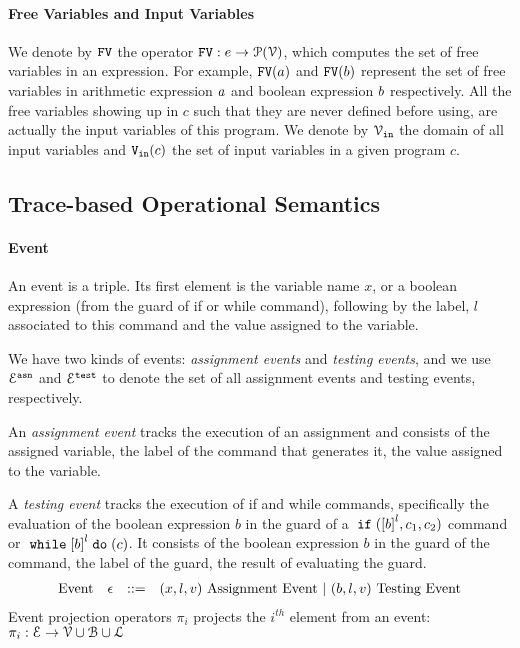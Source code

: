 \paragraph{Free Variables and Input Variables}
  We denote by $\mathtt{FV}$ the operator $\mathtt{FV}: e \to \mathcal{P}(\mathcal{V})$, which computes the set of free variables in an expression. For example,
  $\mathtt{FV}(a)$ and $\mathtt{FV}(b)$ represent the set of free variables in arithmetic
  expression $a$ and boolean expression $b$ respectively.
  All the free variables
  showing up in $c$ such that they are never defined before using, are actually the input variables of this program.
  We denote by $\mathcal{V}_{\mathtt{in}}$ the domain of all input variables and $\mathtt{V_{\mathtt{in}}}(c)$ the set of input variables in a given program $c$.

\subsection{{Trace-based Operational Semantics}}
\label{sec:operational_semantics}
\paragraph{Event}
An event is a triple.
Its first element is the variable name $x$,
or a boolean expression (from the guard of if or while command), 
following by 
 the label, $l$ associated to this command and the value assigned to the variable.

 We have two kinds of events: \emph{assignment events} and \emph{testing events},
 and we use $\mathcal{E}^{\mathtt{{asn}}}$ and $\mathcal{E}^{\mathtt{{test}}}$ to denote the set of all assignment events and testing events, respectively.

 An \emph{assignment event} tracks the execution of an assignment and consists of the assigned variable, the label of the command that generates it, the value assigned to the variable.

 A \emph{testing event} tracks the execution of if and while commands, specifically the evaluation of the boolean expression $b$ in the guard of a $\eif(\clabel{b}^l, c_1, c_2)$ command or $\ewhile \clabel{b}^l \edo (c)$.
 It consists of the boolean expression $b$ in the guard of the command, the label of the guard, the result of evaluating the guard.
%
\[
\begin{array}{llll}
  \mbox{Event} 
  & \mathtt{\epsilon} & ::= & 
  ({x}, l, v) ~ \mbox{Assignment Event} 
  ~|~(b, l, v) ~ \mbox{Testing Event}
\end{array}
\]
Event projection operators $\pi_i$ projects the $i^{th}$ element from an event: 
$\pi_i : \mathcal{E} \to \mathcal{V} \cup \mathcal{B} \cup \mathcal{L} $

